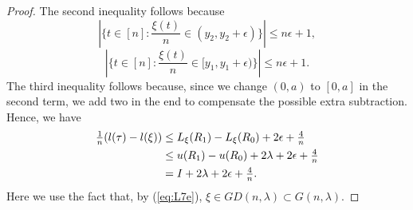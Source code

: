 \begin{proof}
The second inequality follows because
\[
\textstyle|\{t \in [n] : \frac{\xi(t)}{n} \in (y_2, y_2+\epsilon) \}| \le n\epsilon +1,
\]
\[
\textstyle|\{t \in [n] : \frac{\xi(t)}{n} \in [y_1, y_1+\epsilon) \}| \le n\epsilon +1.
\]
The third inequality follows because, since we change $(0, a)$ to $[0, a]$ in the second term, we add two in the end to compensate the possible
extra subtraction. Hence, we have
\begin{align}
\textstyle\frac{1}{n}(l(\tau) - l(\xi))
&\textstyle\le L_{\xi}(R_1 ) - L_{\xi}(R_0) + 2\epsilon + \frac{4}{n}   \label{eq:L7U}\\
&\textstyle\le u(R_1) - u(R_0) + 2\lambda + 2\epsilon + \frac{4}{n}  \nonumber\\
&\textstyle = I + 2\lambda + 2\epsilon + \frac{4}{n}. \nonumber
\end{align}
Here we use the fact that, by (\ref{eq:L7e}), $\xi \in GD(n, \lambda) \subset G(n, \lambda)$.


\end{proof}
